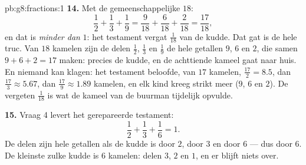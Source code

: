 \begin{solution}{pb:g8:fractions:1}
\textbf{14.} Met de gemeenschappelijke  $18$:
\[
\frac12 + \frac13 + \frac19
= \frac{9}{18} + \frac{6}{18} + \frac{2}{18}
= \frac{17}{18} ,
\]
en dat is \emph{minder dan} $1$: het testament vergat $\frac{1}{18}$ van de kudde. Dat
gat is de hele truc. Van $18$ kamelen zijn de delen $\frac12$, $\frac13$ en $\frac19$
de hele getallen $9$, $6$ en $2$, die samen $9 + 6 + 2 = 17$ maken: precies de kudde,
en de achttiende kameel gaat naar huis. En niemand kan klagen: het testament beloofde,
van $17$ kamelen, $\frac{17}{2} = 8.5$, dan $\frac{17}{3} \approx 5.67$, dan
$\frac{17}{9} \approx 1.89$ kamelen, en elk kind kreeg strikt meer ($9$, $6$ en $2$).
De vergeten $\frac{1}{18}$ is wat de kameel van de buurman tijdelijk opvulde.

\textbf{15.} Vraag 4 levert het gerepareerde testament:
\[
\frac12 + \frac13 + \frac16 = 1 .
\]
De delen zijn hele getallen als de kudde  is door $2$, door $3$ en door $6$ ---
dus  door $6$. De kleinste zulke kudde is $6$ kamelen: delen $3$, $2$ en $1$, en
er blijft niets over.
\end{solution}
